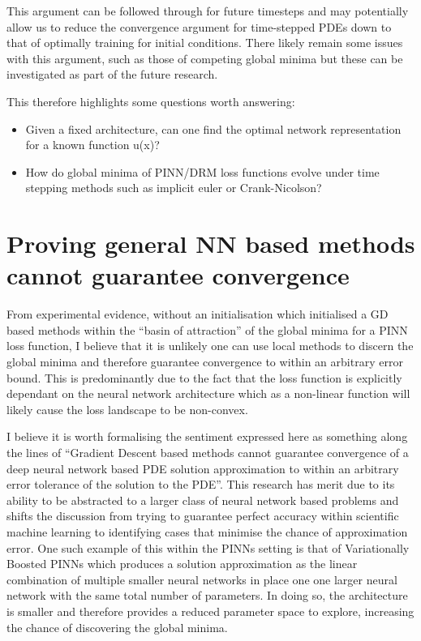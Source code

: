 \documentclass[11pt, onecolumn]{report}
\begin{document}
This argument can be followed through for future timesteps and may potentially allow us to reduce the convergence argument for time-stepped PDEs down to that of optimally training for initial conditions. There likely remain some issues with this argument, such as those of competing global minima but these can be investigated as part of the future research.

This therefore highlights some questions worth answering:

\begin{itemize}
	\item Given a fixed architecture, can one find the optimal network representation for a known function u(x)?
	\item How do global minima of PINN/DRM loss functions evolve under time stepping methods such as implicit euler or Crank-Nicolson?
\end{itemize}


\section{Proving general NN based methods cannot guarantee convergence}
\label{sec:Proof}

From experimental evidence, without an initialisation which initialised a GD based methods within the ``basin of attraction'' of the global minima for a PINN loss function, I believe that it is unlikely one can use local methods to discern the global minima and therefore guarantee convergence to within an arbitrary error bound. This is predominantly due to the fact that the loss function is explicitly dependant on the neural network architecture which as a non-linear function will likely cause the loss landscape to be non-convex. 

I believe it is worth formalising the sentiment expressed here as something along the lines of ``Gradient Descent based methods cannot guarantee convergence of a deep neural network based PDE solution approximation to within an arbitrary error tolerance of the solution to the PDE''.
 This research has merit due to its ability to be abstracted to a larger class of neural network based problems and shifts the discussion from trying to guarantee perfect accuracy within scientific machine learning to identifying cases that minimise the chance of approximation error. One such example of this within the PINNs setting is that of Variationally Boosted PINNs \cite{BoostedPINNs} which produces a solution approximation as the linear combination of multiple smaller neural networks in place one one larger neural network with the same total number of parameters. In doing so, the architecture is smaller and therefore provides a reduced parameter space to explore, increasing the chance of discovering the global minima.
\end{document}

